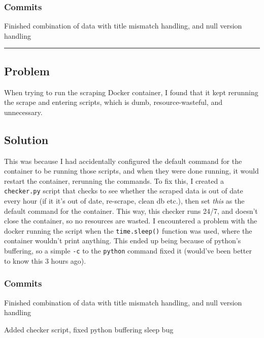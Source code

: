 \documentclass{article}
\begin{document}
\subsubsection*{Commits}
\begin{description}\small
    \item[\texttt{8713b9e}] Finished combination of data with title mismatch handling, and null version handling
\end{description}
\normalfont

\begin{center}
\rule{0.5\textwidth}{0.2pt}
\end{center}

\subsection*{Problem}
When trying to run the scraping Docker container, I found that it kept rerunning the scrape and entering scripts, which is dumb, resource-wasteful, and unnecessary.
\subsection*{Solution}
This was because I had accidentally configured the default command for the container to be running those scripts, and when they were done running, it would restart the container, rerunning the commands. To fix this, I created a \texttt{checker.py} script that checks to see whether the scraped data is out of date every hour (if it it's out of date, re-scrape, clean db etc.), then set \textit{this} as the default command for the container. This way, this checker runs 24/7, and doesn't close the container, so no resources are wasted. I encountered a problem with the docker running the script when the \texttt{time.sleep()} function was used, where the container wouldn't print anything. This ended up being because of python's buffering, so a simple \texttt{-c} to the \texttt{python} command fixed it (would've been better to know this 3 hours ago).

\subsubsection*{Commits}
\begin{description}\small
    \item[\texttt{8713b9e}] Finished combination of data with title mismatch handling, and null version handling
    \item[\texttt{786b521}]  Added checker script, fixed python buffering sleep bug
\end{description}
\normalfont
\end{document}
